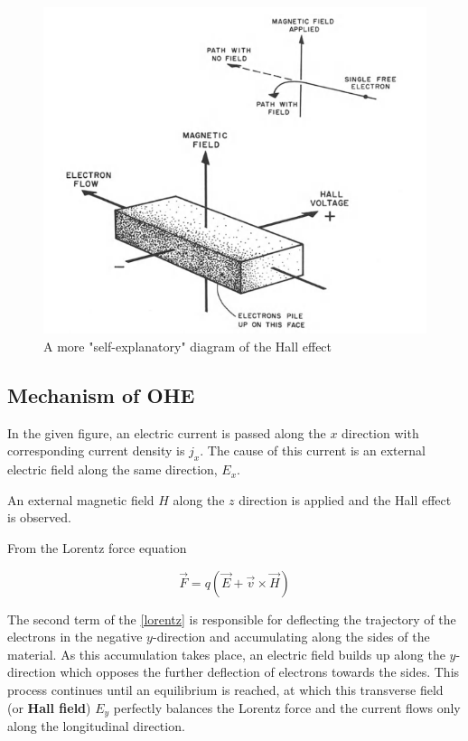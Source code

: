 \begin{figure}[h]
    \includegraphics[width=\columnwidth]{hall-effect-hurd.png}
    \caption{A more "self-explanatory" diagram of the Hall effect}
\end{figure}

\subsection{Mechanism of OHE}

In the given figure, an electric current is passed along the $ x $ direction with corresponding current density is $ j_x $. The cause of this current is an external electric field along the same direction, $ E_x $.

An external magnetic field $ H $ along the $ z $ direction is applied and the Hall effect is observed.

From the Lorentz force equation

\begin{equation} \label{lorentz} 
    \vec{F} = q (\vec{E} + \vec{v} \times \vec{H})
\end{equation}

The second term of the \cref{lorentz} is responsible for deflecting the trajectory of the electrons in the negative $ y $-direction and accumulating along the sides of the material. As this accumulation takes place, an electric field builds up along the $ y $-direction which opposes the further deflection of electrons towards the sides. This process continues until an equilibrium is reached, at which this transverse field (or \textbf{Hall field}) $ E_y $ perfectly balances the Lorentz force and the current flows only along the longitudinal direction.

